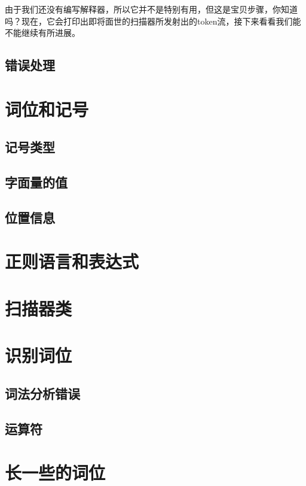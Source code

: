 \documentclass[cn,10pt,math=newtx,citestyle=gb7714-2015,bibstyle=gb7714-2015]{elegantbook}
\begin{document}
由于我们还没有编写解释器，所以它并不是特别有用，但这是宝贝步骤，你知道吗？现在，它会打印出即将面世的扫描器所发射出的token流，接下来看看我们能不能继续有所进展。

\subsection{错误处理}

\section{词位和记号}

\subsection{记号类型}

\subsection{字面量的值}

\subsection{位置信息}

\section{正则语言和表达式}

\section{扫描器类}

\section{识别词位}

\subsection{词法分析错误}

\subsection{运算符}

\section{长一些的词位}
\end{document}

